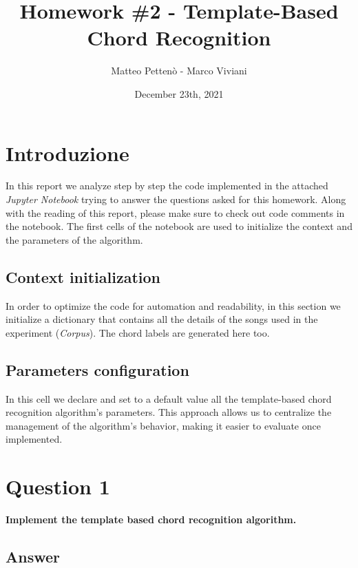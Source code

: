 \documentclass[
	12pt, %
]{fphw}
\title{Homework \#2 - Template-Based Chord Recognition} %
\author{Matteo Pettenò - Marco Viviani} %
\date{December 23th, 2021} %
\institute{Politecnico di Milano} %
\begin{document}
\maketitle %


\section*{Introduzione}

In this report we analyze step by step the code implemented in the attached \emph{Jupyter Notebook} trying to answer the questions asked for this homework. Along with the reading of this report, please make sure to check out code comments in the notebook. The first cells of the notebook are used to initialize the context and the parameters of the algorithm.

\subsection*{Context initialization}
In order to optimize the code for automation and readability, in this section we initialize a dictionary that contains all the details of the songs used in the experiment (\emph{Corpus}). The chord labels are generated here too.

\subsection*{Parameters configuration}
In this cell we declare and set to a default value all the template-based chord recognition algorithm's parameters. This approach allows us to centralize the management of the algorithm's behavior, making it easier to evaluate once implemented.

\section*{\color{red}Question 1}

\begin{problem}
	\textbf{Implement the template based chord recognition algorithm.}
\end{problem}

\subsection*{\color{blue}Answer}
\end{document}
